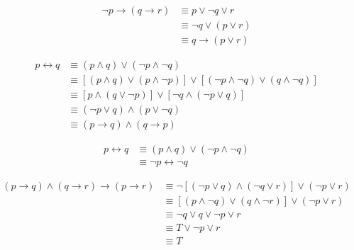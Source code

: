 {{        %
        \begin{practices}
            \begin{align*}
                \neg p \rightarrow (q \rightarrow r)
                &\equiv p \vee \neg q \vee r \\
                &\equiv \neg q \vee (p \vee r) \\
                &\equiv q \rightarrow (p \vee r)
            \end{align*}
        \end{practices}

        \begin{practices}
            \begin{align*}
                p \leftrightarrow q
                &\equiv (p \wedge q) \vee (\neg p \wedge \neg q) \\
                &\equiv [(p \wedge q) \vee (p \wedge \neg p)] \vee [(\neg p \wedge \neg q) \vee (q \wedge \neg q)] \\
                &\equiv [p \wedge (q \vee \neg p)] \vee [\neg q \wedge (\neg p \vee q)] \\
                &\equiv (\neg p \vee q) \wedge (p \vee \neg q) \\
                &\equiv (p \rightarrow q) \wedge (q \rightarrow p)
            \end{align*}
        \end{practices}

        \begin{practices}
            \begin{align*}
                p \leftrightarrow q
                &\equiv (p \wedge q) \vee (\neg p \wedge \neg q) \\
                &\equiv \neg p \leftrightarrow \neg q
            \end{align*}
        \end{practices}

        \begin{practices}
            \begin{align*}
                (p \rightarrow q) \wedge (q \rightarrow r) \rightarrow (p \rightarrow r)
                &\equiv \neg [(\neg p \vee q) \wedge (\neg q \vee r)] \vee (\neg p \vee r) \\
                &\equiv [(p \wedge \neg q) \vee (q \wedge \neg r)] \vee (\neg p \vee r) \\
                &\equiv \neg q \vee q \vee \neg p \vee r \\
                &\equiv T \vee \neg p \vee r \\
                &\equiv T
            \end{align*}
        \end{practices}

}}
